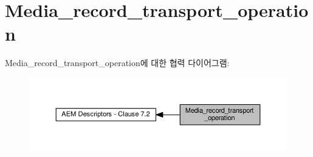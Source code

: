\hypertarget{group__media__record__transport__operation}{}\section{Media\+\_\+record\+\_\+transport\+\_\+operation}
\label{group__media__record__transport__operation}
Media\+\_\+record\+\_\+transport\+\_\+operation에 대한 협력 다이어그램\+:
\nopagebreak
\begin{figure}[H]
\begin{center}
\leavevmode
\includegraphics[width=350pt]{group__media__record__transport__operation}
\end{center}
\end{figure}
